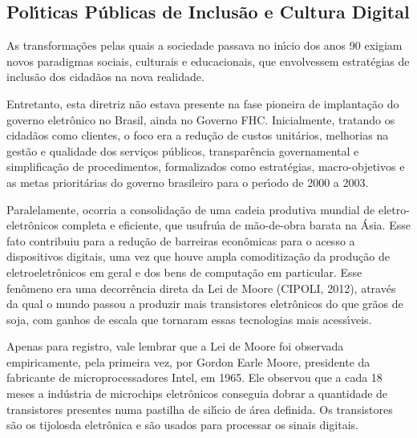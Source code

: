 \documentclass[
12pt,		%
openright,	%
twoside,  %
a4paper,			%
chapter=TITLE,		%
english,			%
french,				%
spanish,			%
brazil				%
]{USPSC-classe/USPSC}
\begin{document}
\subsection[Pol\'{\i}ticas P\'ublicas de Inclus\~ao e Cultura Digital]{Pol\'{\i}ticas P\'ublicas de Inclus\~ao e Cultura Digital}\label{Pol\'{\i}ticas P\'ublicas de Inclus\~ao e Cultura Digital}
As transforma\c{c}\~oes pelas quais a sociedade passava no in\'{\i}cio dos anos 90 exigiam novos paradigmas sociais, culturais e educacionais, que envolvessem estrat\'egias de inclus\~ao dos  cidad\~aos na nova realidade.









Entretanto, esta diretriz n\~ao estava presente na fase pioneira de implanta\c{c}\~ao do governo eletr\^onico no Brasil, ainda no Governo FHC. Inicialmente, tratando os cidad\~aos como clientes, o foco era a redu\c{c}\~ao de custos unit\'arios, melhorias na gest\~ao e qualidade dos servi\c{c}os p\'ublicos, transpar\^encia governamental e simplifica\c{c}\~ao de procedimentos, formalizados como estrat\'egias, macro-objetivos e  as metas priorit\'arias  do governo brasileiro para o per\'{\i}odo de 2000 a 2003.









Paralelamente, ocorria a consolida\c{c}\~ao de uma cadeia produtiva mundial de eletro-eletr\^onicos completa e eficiente, que usufru\'{\i}a de m\~ao-de-obra barata na \'Asia. Esse fato contribuiu para a redu\c{c}\~ao de barreiras econ\^omicas para o acesso a dispositivos digitais, uma vez que houve ampla comoditiza\c{c}\~ao da produ\c{c}\~ao de eletroeletr\^onicos em geral e dos bens de computa\c{c}\~ao em particular. Esse fen\^omeno era uma decorr\^encia direta da Lei de Moore (CIPOLI, 2012), atrav\'es da qual o mundo passou a produzir mais transistores eletr\^onicos do que gr\~aos de soja, com ganhos de escala que tornaram essas tecnologias mais acess\'{\i}veis.









Apenas para registro, vale lembrar que a Lei de Moore foi observada empiricamente, pela primeira vez, por Gordon Earle Moore, presidente da fabricante de microprocessadores Intel, em 1965. Ele observou que a cada 18 meses a ind\'ustria de microchips eletr\^onicos conseguia dobrar a quantidade de transistores presentes numa pastilha de sil\'{\i}cio de \'area definida. Os transistores s\~ao os \textquotedbl tijolos\textquotedbl  da eletr\^onica e s\~ao usados para processar os sinais digitais.
\end{document}
